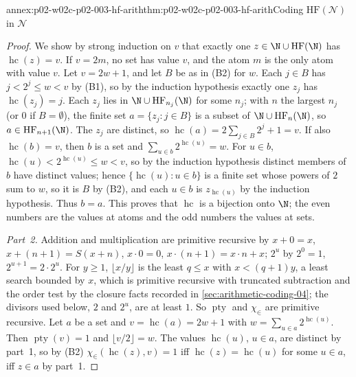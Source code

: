 \begin{annexitem}{annex:p02-w02c-p02-003-hf-arith}{thm:p02-w02c-p02-003-hf-arith}{Coding \(\mathrm{HF}(\mathcal N)\) in \(\mathcal N\)}
\begin{proof}
We show by strong induction on \(v\) that exactly one
\(z\in\N\cup\mathrm{HF}(\N)\) has \(\operatorname{hc}(z)=v\).  If \(v=2m\),
no set has value \(v\), and the atom \(m\) is the only atom with value
\(v\).  Let \(v=2w+1\), and let \(B\) be as in (B2) for \(w\).  Each
\(j\in B\) has \(j<2^{j}\leq w<v\) by (B1), so by the induction hypothesis
exactly one \(z_j\) has \(\operatorname{hc}(z_j)=j\).  Each \(z_j\) lies in
\(\N\cup\mathrm{HF}_{n_j}(\N)\) for some \(n_j\); with \(n\) the largest
\(n_j\) (or \(0\) if \(B=\emptyset\)), the finite set
\(a=\{z_j:j\in B\}\) is a subset of \(\N\cup\mathrm{HF}_n(\N)\), so
\(a\in\mathrm{HF}_{n+1}(\N)\).  The \(z_j\) are distinct, so
\(\operatorname{hc}(a)=2\sum_{j\in B}2^{j}+1=v\).  If also
\(\operatorname{hc}(b)=v\), then \(b\) is a set and
\(\sum_{u\in b}2^{\operatorname{hc}(u)}=w\).  For \(u\in b\),
\(\operatorname{hc}(u)<2^{\operatorname{hc}(u)}\leq w<v\), so by the
induction hypothesis distinct members of \(b\) have distinct values; hence
\(\{\operatorname{hc}(u):u\in b\}\) is a finite set whose powers of \(2\)
sum to \(w\), so it is \(B\) by (B2), and each \(u\in b\) is
\(z_{\operatorname{hc}(u)}\) by the induction hypothesis.  Thus \(b=a\).
This proves that \(\operatorname{hc}\) is a bijection onto \(\N\); the even
numbers are the values at atoms and the odd numbers the values at sets.

\emph{Part~2.}  Addition and multiplication are primitive recursive by
\(x+0=x\), \(x+(n+1)=S(x+n)\), \(x\cdot0=0\), \(x\cdot(n+1)=x\cdot n+x\);
\(2^{u}\) by \(2^{0}=1\), \(2^{u+1}=2\cdot2^{u}\).  For \(y\geq1\),
\(\lfloor x/y\rfloor\) is the least \(q\leq x\) with \(x<(q+1)y\), a least
search bounded by \(x\), which is primitive recursive with truncated
subtraction and the order test by the closure facts recorded in
\cref{sec:arithmetic-coding-04}; the divisors used below, \(2\) and
\(2^{u}\), are at least \(1\).  So \(\operatorname{pty}\) and
\(\chi_{\in}\) are primitive recursive.  Let \(a\) be a set and
\(v=\operatorname{hc}(a)=2w+1\) with
\(w=\sum_{u\in a}2^{\operatorname{hc}(u)}\).  Then
\(\operatorname{pty}(v)=1\) and \(\lfloor v/2\rfloor=w\).  The values
\(\operatorname{hc}(u)\), \(u\in a\), are distinct by part~1, so by (B2)
\(\chi_{\in}(\operatorname{hc}(z),v)=1\) iff
\(\operatorname{hc}(z)=\operatorname{hc}(u)\) for some \(u\in a\), iff
\(z\in a\) by part~1.


\end{proof}
\end{annexitem}
